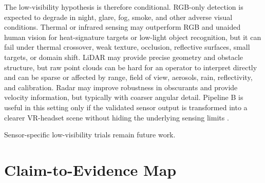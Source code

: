 \documentclass[fleqn]{VRIH2025}
\begin{document}
The low-visibility hypothesis is therefore conditional. RGB-only detection is expected to degrade in night, glare, fog, smoke, and other adverse visual conditions. Thermal or infrared sensing may outperform RGB and unaided human vision for heat-signature targets or low-light object recognition, but it can fail under thermal crossover, weak texture, occlusion, reflective surfaces, small targets, or domain shift. LiDAR may provide precise geometry and obstacle structure, but raw point clouds can be hard for an operator to interpret directly and can be sparse or affected by range, field of view, aerosols, rain, reflectivity, and calibration. Radar may improve robustness in obscurants and provide velocity information, but typically with coarser angular detail. Pipeline B is useful in this setting only if the validated sensor output is transformed into a clearer VR-headset scene without hiding the underlying sensing limits \cite{li2025irvisuav,liu2026infrareduav,farina2026lidarradar,fercho2026faa_svs}.

Sensor-specific low-visibility trials remain future work.

\section{Claim-to-Evidence Map}
\end{document}

